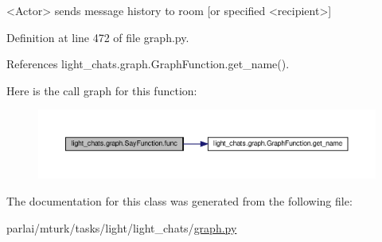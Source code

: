 \begin{DoxyVerb}<Actor> sends message history to room [or specified <recipient>]\end{DoxyVerb}
 

Definition at line 472 of file graph.\+py.



References light\+\_\+chats.\+graph.\+Graph\+Function.\+get\+\_\+name().

Here is the call graph for this function\+:
\nopagebreak
\begin{figure}[H]
\begin{center}
\leavevmode
\includegraphics[width=350pt]{classlight__chats_1_1graph_1_1SayFunction_af14fb1e5a036d9c537ea2915f2c76275_cgraph}
\end{center}
\end{figure}


The documentation for this class was generated from the following file\+:\begin{DoxyCompactItemize}
\item 
parlai/mturk/tasks/light/light\+\_\+chats/\hyperlink{parlai_2mturk_2tasks_2light_2light__chats_2graph_8py}{graph.\+py}\end{DoxyCompactItemize}
